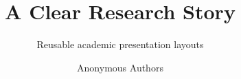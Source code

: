 \newif\ifChineseSlides
\ChineseSlidesfalse %
\newcommand{\LatinFontName}{Constantia} %
\newcommand{\DigitFontName}{TeX Gyre Heros} %
\newcommand{\CJKFontSet}{fandol} %


\title[Research Talk]{A Clear Research Story}
\subtitle{Reusable academic presentation layouts}
\author{Anonymous Authors}
\newcommand{\Presenter}{Anonymous Presenter}
\institute{} %
\newcommand{\Contact}{} %
\newcommand{\TalkType}{Research Presentation}
\newcommand{\ProgressLabelOne}{Question}
\newcommand{\ProgressLabelTwo}{Data \& Design}
\newcommand{\ProgressLabelThree}{Domestic}
\newcommand{\ProgressLabelFour}{International}
\newcommand{\ProgressLabelFive}{Conclusion}
\newcommand{\ProgressOneStart}{1}
\newcommand{\ProgressOneEnd}{5}
\newcommand{\ProgressTwoStart}{6}
\newcommand{\ProgressTwoEnd}{8}
\newcommand{\ProgressThreeStart}{9}
\newcommand{\ProgressThreeEnd}{10}
\newcommand{\ProgressFourStart}{11}
\newcommand{\ProgressFourEnd}{12}
\newcommand{\ProgressFiveStart}{13}
\newcommand{\ProgressFiveEnd}{17}
\date{}
